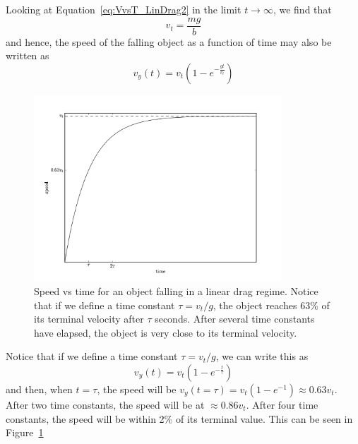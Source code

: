Looking at Equation~\ref{eq:VvsT_LinDrag2} in the limit $t\rightarrow \infty$, we find that 
\begin{equation}
v_t = \frac{mg}{b}
\label{eq:terminal_v}
\end{equation}
and hence, the speed of the falling object as a function of time may also be written as 
\begin{equation}
v_{y} (t) = v_{t} \left(1-e^{-\frac{gt}{v_{t}}}\right)
\label{eq:VvsT_LinDrag3}
\end{equation}
\begin{figure}[t]
\centering
\includegraphics[height=7cm]{Figures/5Kinematics/LinearDragSpeed}
\caption{Speed vs time for an object falling in a linear drag regime. Notice that if we define a time constant $\tau = v_t/g$, the object reaches 63\% of its terminal velocity after $\tau$ seconds. After several time constants have elapsed, the object is very close to its terminal velocity.}
\label{fig-LinearDrag}       %
\end{figure}
Notice that if we define a time constant $\tau = v_{t}/g$, we can write this as
\begin{equation}
v_{y} (t) = v_{t} \left(1-e^{-\frac{t}{\tau}}\right)
\label{eq:VvsT_LinDrag4}
\end{equation}
and then, when $t=\tau$, the speed will be $v_{y} (t=\tau) = v_{t} \left(1-e^{-1}\right)\approx 0.63v_t$. After two time constants, the speed will be at $\approx 0.86v_t$. After four time constants, the speed will be within 2\% of its terminal value. This can be seen in Figure~\ref{fig-LinearDrag}

